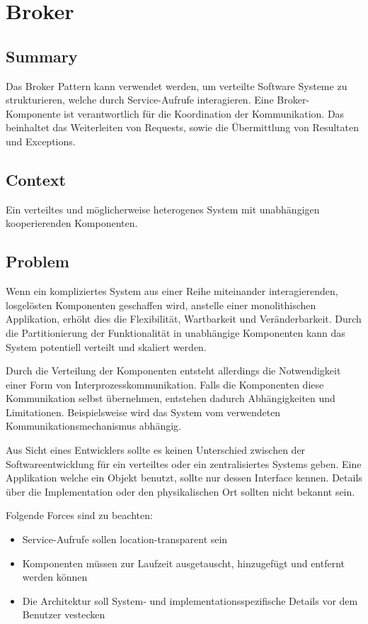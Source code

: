 \chapter{Broker}

\section{Summary}
Das Broker Pattern kann verwendet werden, um verteilte Software Systeme zu strukturieren, welche durch Service-Aufrufe interagieren. Eine Broker-Komponente ist verantwortlich für die Koordination der Kommunikation. Das beinhaltet das Weiterleiten von Requests, sowie die Übermittlung von Resultaten und Exceptions.

\section{Context}
Ein verteiltes und möglicherweise heterogenes System mit unabhängigen kooperierenden Komponenten.

\section{Problem}
Wenn ein kompliziertes System aus einer Reihe miteinander interagierenden, losgelösten Komponenten geschaffen wird, anstelle einer monolithischen Applikation, erhöht dies die Flexibilität, Wartbarkeit und Veränderbarkeit. Durch die Partitionierung der Funktionalität in unabhängige Komponenten kann das System potentiell verteilt und skaliert werden.

Durch die Verteilung der Komponenten entsteht allerdings die Notwendigkeit einer Form von Interprozesskommunikation. Falls die Komponenten diese Kommunikation selbst übernehmen, entstehen dadurch Abhängigkeiten und Limitationen. Beispielsweise wird das System vom verwendeten Kommunikationsmechanismus abhängig.

Aus Sicht eines Entwicklers sollte es keinen Unterschied zwischen der Softwareentwicklung für ein verteiltes oder ein zentralisiertes Systems geben. Eine Applikation welche ein Objekt benutzt, sollte nur dessen Interface kennen. Details über die Implementation oder den physikalischen Ort sollten nicht bekannt sein. 

\medskip
Folgende Forces sind zu beachten:
\begin{itemize}
	\item Service-Aufrufe sollen \glqq location-transparent\grqq{} sein
	\item Komponenten müssen zur Laufzeit ausgetauscht, hinzugefügt und entfernt werden können
	\item Die Architektur soll System- und implementationsspezifische Details vor dem Benutzer vestecken
\end{itemize}

